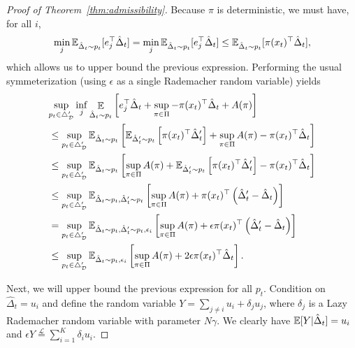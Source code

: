 \documentclass{article}
\begin{document}
\begin{proof}[Proof of Theorem~\ref{thm:admissibility}]
Because $\pi$ is deterministic, we must have, for all $i$,
\[
  \min_j \mathbb E_{\hat\Delta_t \sim p_t}
  [e_j^\top \hat\Delta_t]
  =
  \min_j \mathbb E_{\hat\Delta_t \sim p_t}
  [e_j^\top\hat\Delta_t]
  \leq
  \mathbb E_{\hat\Delta_t \sim p_t }[\pi(x_t)^\top \hat\Delta_t],
\]
which allows us to upper bound the previous expression. Performing the usual symmeterization (using $\epsilon$ as a single Rademacher random variable) yields
\begin{align*}
  &\lefteqn{
        \sup_{p_t\in\triangle_{\mathcal D}'}
    \inf_{j}  
    \mathop{\ex}_{\hat\Delta_t\sim p_t}\left[ e_j^\top  \hat \Delta_t
    +
    \sup_{\pi\in\Pi} -\pi(x_t)^\top \hat\Delta_t + A(\pi)\right]
    }\\
    &\leq
    \sup_{p_t\in\triangle_{\mathcal D}'}
     \ex_{\hat\Delta_t\sim p_t}\left[
      \ex_{\hat\Delta_t'\sim p_t}\left[\pi(x_t)^\top  \hat\Delta_t'\right]
     +\sup_{\pi\in\Pi} A(\pi)
    -\pi(x_t)^\top  \hat\Delta_t
  \right]\\
  &\leq
    \sup_{p_t\in\triangle_{\mathcal D}'}
     \ex_{\hat\Delta_t\sim p_t}\left[
     \sup_{\pi\in\Pi} A(\pi)
    +\ex_{\hat\Delta_t'\sim p_t}\left[\pi(x_t)^\top  \hat\Delta_t'\right]
    -\pi(x_t)^\top  \hat\Delta_t
  \right]\\
  &\leq
    \sup_{p_t\in\triangle_{\mathcal D}'}
     \ex_{\hat\Delta_t\sim p_t, \hat\Delta_t'\sim p_t}\left[
        \sup_{\pi\in\Pi} A(\pi)+
        \pi(x_t)^\top \left(\hat\Delta_t'-\hat\Delta_t\right)
    \right]\\
  &=
    \sup_{p_t\in\triangle_{\mathcal D}'}
     \ex_{\hat\Delta_t\sim p_t, \hat\Delta_t'\sim p_t,\epsilon_i}\left[
        \sup_{\pi\in\Pi} A(\pi)+
        \epsilon\pi(x_t)^\top \left(\hat\Delta_t'-\hat\Delta_t\right)
    \right]\\
    &\leq
    \sup_{p_t\in\triangle_{\mathcal D}'}
     \ex_{\hat\Delta_t\sim p_t,\epsilon_i}\left[
        \sup_{\pi\in\Pi} A(\pi)+
        2\epsilon\pi(x_t)^\top \hat\Delta_t
        \right].
\end{align*}

Next, we will upper bound the previous expression for all $p_t$. Condition on $\hat \Delta_t= u_i$ and define the random variable $Y = \sum_{j\neq i} u_i + \delta_j u_j$, where $\delta_j$ is a Lazy Rademacher random variable with parameter $N\gamma$. We clearly have $\mathbb E[Y|\hat \Delta_t] = u_i$ and $\epsilon Y \stackrel{\mathcal L}{=} \sum_{i=1}^K \delta_i u_i$.



\end{proof}
\end{document}
